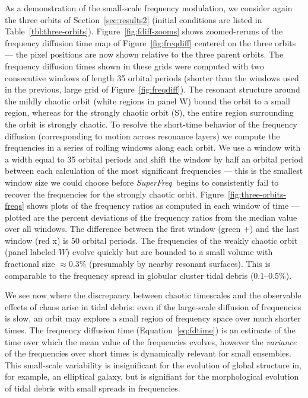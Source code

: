 \documentclass[letterpaper,12pt,preprint]{aastex}
\newcommand{\project}[1]{\textsl{#1}}
\newcommand{\superfreq}{\project{SuperFreq}}
\begin{document}
As a demonstration of the small-scale frequency modulation, we consider again the three orbits of Section~\ref{sec:results2} (initial conditions are listed in Table~\ref{tbl:three-orbits}). Figure~\ref{fig:fdiff-zooms} shows zoomed-reruns of the frequency diffusion time map of Figure~\ref{fig:freqdiff} centered on the three orbits --- the pixel positions are now shown relative to the three parent orbits. The frequency diffusion times shown in these grids were computed with two consecutive windows of length 35 orbital periods (shorter than the windows used in the previous, large grid of Figure~\ref{fig:freqdiff}). The resonant structure around the mildly chaotic orbit (white regions in panel W) bound the orbit to a small region, whereas for the strongly chaotic orbit (S), the entire region surrounding the orbit is strongly chaotic. To resolve the short-time behavior of the frequency diffusion (corresponding to motion across resonance layers) we compute the frequencies in a series of rolling windows along each orbit. We use a window with a width equal to 35 orbital periods and shift the window by half an orbital period between each calculation of the most significant frequencies --- this is the smallest window size we could choose before \superfreq\ begins to consistently fail to recover the frequencies for the strongly chaotic orbit.  Figure~\ref{fig:three-orbits-freqs} shows plots of the frequency ratios as computed in each window of time --- plotted are the percent deviations of the frequency ratios from the median value over all windows. The difference between the first window (green +) and the last window (red x) is 50 orbital periods. The frequencies of the weakly chaotic orbit (panel labeled $W$) evolve quickly but are bounded to a small volume with fractional size $\approx$0.3\% (presumably by nearby resonant surfaces). This is comparable to the frequency spread in globular cluster tidal debris (0.1--0.5\%).

We see now where the discrepancy between chaotic timescales and the observable effects of chaos arise in tidal debris: even if the large-scale diffusion of frequencies is slow, an orbit may explore a small region of frequency space over much shorter times. The frequency diffusion time (Equation~\ref{eq:fdtime}) is an estimate of the time over which the mean value of the frequencies evolves, however the \emph{variance} of the frequencies over short times is dynamically relevant for small ensembles. This small-scale variability is insignificant for the evolution of global structure in, for example, an elliptical galaxy, but is signifiant for the morphological evolution of tidal debris with small spreads in frequencies.
\end{document}
